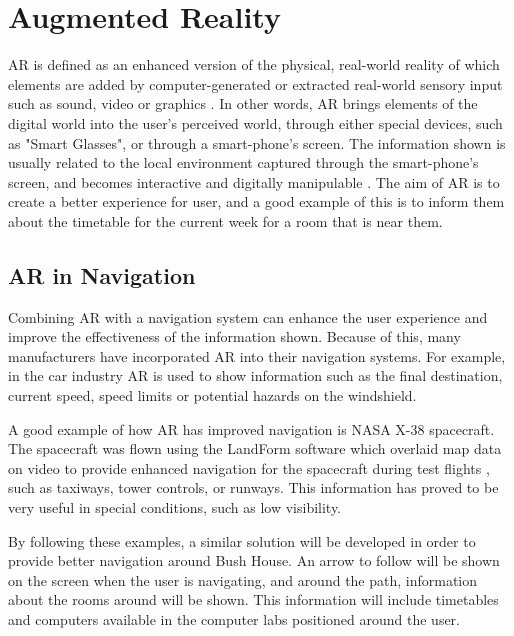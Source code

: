 \section{Augmented Reality}
AR is defined as an enhanced version of the physical, real-world reality of which elements are added by computer-generated or extracted real-world sensory input such as sound, video or graphics \cite{ar-definition}. In other words, AR brings elements of the digital world into the user's perceived world, through either special devices, such as "Smart Glasses", or through a smart-phone's screen. The information shown is usually related to the local environment captured through the smart-phone's screen, and becomes interactive and digitally manipulable \cite{ar-definition-2}. The aim of AR is to create a better experience for user, and a good example of this is to inform them about the timetable for the current week for a room that is near them.

\subsection{AR in Navigation}

Combining AR with a navigation system can enhance the user experience and improve the effectiveness of the information shown. Because of this, many manufacturers have incorporated AR into their navigation systems. For example, in the car industry AR is used to show information such as the final destination, current speed, speed limits or potential hazards on the windshield.

A good example of how AR has improved navigation is NASA X-38 spacecraft. The spacecraft was flown using the LandForm software which overlaid map data on video to provide enhanced navigation for the spacecraft during test flights \cite{nasa-ar-nav}, such as taxiways, tower controls, or runways. This information has proved to be very useful in special conditions, such as low visibility. 

By following these examples, a similar solution will be developed in order to provide better navigation around Bush House. An arrow to follow will be shown on the screen when the user is navigating, and around the path, information about the rooms around will be shown. This information will include timetables and computers available in the computer labs positioned around the user.

